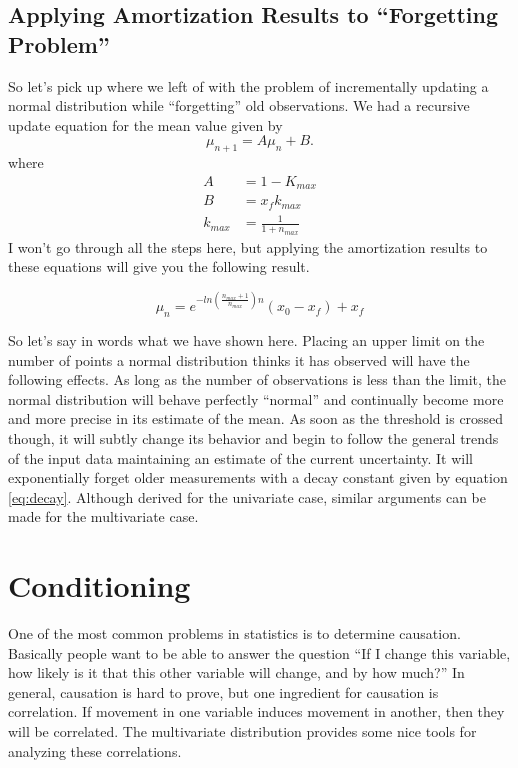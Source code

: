 \documentclass[../../main.tex]{subfiles}
\begin{document}
\subsection{Applying Amortization Results to ``Forgetting Problem''}
So let's pick up where we left of with the problem of incrementally updating a
normal distribution while ``forgetting'' old observations.  We had a recursive
update equation for the mean value given by
\begin{equation}
    \mu_{n+1} = A \mu_n + B. \nonumber
\end{equation}
where
\begin{align}
    A &= 1 - K_{max} \nonumber\\
    B &= x_f k_{max} \nonumber\\
    k_{max} &= \frac{1}{1+n_{max}}
\end{align}
I won't go through all the steps here, but applying the amortization results
to these equations will give you the following result.

\begin{equation}
    \label{eq:expsolution}
    \mu_n = e^{-ln \left( \frac{n_{max} + 1}{n_{max}}  \right) n}
          \left( x_0 - x_f \right) + x_f
\end{equation}

So let's say in words what we have shown here.  Placing an upper limit on the
number of points a normal distribution thinks it has observed will have the
following effects.  As long as the number of observations is less than the
limit, the normal distribution will behave perfectly ``normal'' and
continually become more and more precise in its estimate of the mean.  As soon
as the threshold is crossed though, it will subtly change its behavior and
begin to follow the general trends of the input data maintaining an estimate
of the current uncertainty.  It will exponentially forget older measurements
with a decay constant given by equation \eqref{eq:decay}. Although derived for
the univariate case, similar arguments can be made for the multivariate case.
 
\section{Conditioning}
One of the most common problems in statistics is to determine causation.
Basically people want to be able to answer the question ``If I change this
variable, how likely is it that this other variable will change, and by how
much?''  In general, causation is hard to prove, but one ingredient for
causation is correlation.  If movement in one variable induces movement in
another, then they will be correlated.  The multivariate distribution provides
some nice tools for analyzing these correlations.
\end{document}
